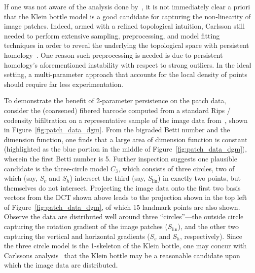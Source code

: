 \documentclass[sn-mathphys]{sn-jnl}
\begin{document}
If one was not aware of the analysis done by~\cite{lee2003nonlinear, hateren_schaaf_1998, carlsson2008local, perea2014klein}, it is not immediately clear a priori that the Klein bottle model is  a good candidate for capturing the non-linearity of image patches. 
Indeed, armed with a refined topological intuition, Carlsson still needed to perform extensive sampling, preprocessing, and model fitting techniques in order to reveal the underlying the topological space with persistent homology~\cite{carlsson2008local}.
One reason such preprocessing is needed is due to persistent homology's aforementioned instability with respect to strong outliers. 
In the ideal setting, a multi-parameter approach that accounts for the local density of points should require far less experimentation. 
 
To demonstrate the benefit of 2-parameter persistence on the patch data, consider the (coarsened) fibered barcode computed from a standard Rips / codensity bifiltration on a representative sample of the image data from~\cite{hateren_schaaf_1998}, shown in Figure~\ref{fig:patch_data_dgm}. 
From the bigraded Betti number and the dimension function, one finds that a large area of dimension function is constant (highlighted as the blue portion in the middle of Figure~\ref{fig:patch_data_dgm}), wherein the first Betti number is 5. Further inspection suggests one plausible candidate is the three-circle model $C_3$, which consists of three circles, two of which (say, $S_v$ and $S_h$) intersect the third (say, $S_\mathrm{lin}$) in exactly two points, but themselves do not intersect. 
Projecting the image data onto the first two basis vectors from the DCT shown above leads to the projection shown in the top left of Figure~\ref{fig:patch_data_dgm}, of which 15 landmark points are also shown. Observe the data are distributed well around three ``circles''---the outside circle capturing the rotation gradient of the image patches ($S_{\mathrm{lin}}$), and the other two capturing the vertical and horizontal gradients ($S_v$ and $S_h$, respectively). Since the three circle model is the 1-skeleton of the Klein bottle, one may concur with Carlssons analysis~\cite{carlsson2008local} that the Klein bottle may be a reasonable candidate upon which the image data are distributed. 
\end{document}
